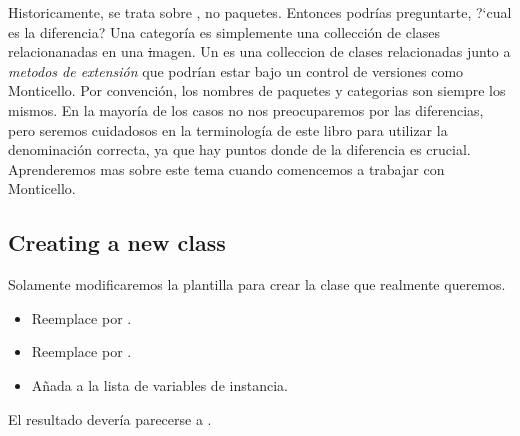 \documentclass[a4paper,10pt,twoside]{book}
\begin{document}

Historicamente, se trata sobre , no paquetes.
Entonces podrías preguntarte, ?`cual es la diferencia?
Una categoría es simplemente una collección de clases relacionanadas en
una \st imagen.
Un  es una colleccion de clases relacionadas junto a
\emph{metodos de extensión} que podrían estar bajo un control de versiones
como Monticello.
Por convención, los nombres de paquetes y categorias son siempre los mismos.
En la mayoría de los casos no nos preocuparemos por las diferencias, pero
seremos cuidadosos en la terminología de este libro para utilizar la
denominación correcta, ya que hay puntos donde de la diferencia es crucial.
Aprenderemos mas sobre este tema cuando comencemos a trabajar con Monticello.


\subsection{Creating a new class}

Solamente modificaremos la plantilla para crear la clase que realmente queremos.

\begin{itemize}
  \item Reemplace  por .
  \item Reemplace  por .
  \item Añada  a la lista de variables de instancia.
\end{itemize}
El resultado devería parecerse a .
\end{document}
